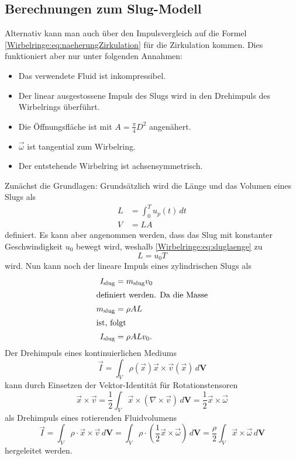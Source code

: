 \subsection{Berechnungen zum Slug-Modell}
Alternativ kann man auch über den Impulsvergleich auf die Formel \eqref{Wirbelringe:eq:naeherungZirkulation} für die Zirkulation kommen.
Dies funktioniert aber nur unter folgenden Annahmen:
\begin{itemize}
    \item Das verwendete Fluid ist inkompressibel.
    \item Der linear ausgestossene Impuls des Slugs wird in den Drehimpuls des Wirbelrings überführt.
    \item Die Öffnungsfläche ist mit \(A = \frac{\pi}{4} D^2\) angenähert.
    \item \(\vec{\omega}\) ist tangential zum Wirbelring.
    \item Der entstehende Wirbelring ist achsensymmetrisch.
\end{itemize} 

Zunächst die Grundlagen:
Grundsätzlich wird die Länge und das Volumen eines Slugs als
\begin{align}
    L
    &=
    \int_{0}^{T}u_p(t)\,dt\\
    \label{Wirbelringe:eq:sluglaenge}
    V
    &=
    LA
\end{align}
definiert.
Es kann aber angenommen werden, dass das Slug mit konstanter Geschwindigkeit \(u_0\) bewegt wird, weshalb \eqref{Wirbelringe:eq:sluglaenge} zu
\begin{equation}
    L
    =
    u_0T
\end{equation}
wird.
Nun kann noch der lineare Impuls eines zylindrischen Slugs als
\begin{align}
    I_{\text{slug}}
    &=
    m_{\text{slug}}v_0\\
    \intertext{definiert werden. Da die Masse}
    m_{\text{slug}}
    &=
    \rho AL\\
    \intertext{ist, folgt}
    I_{\text{slug}}
    &=
    \rho ALv_0
    \label{Wirbelringe:eq:slugImp}.
\end{align}
Der Drehimpuls eines kontinuierlichen Mediums
\begin{equation*}
    \vec{I}
    =
    \int_{V}\rho(\vec{x})\vec{x}\times\vec{v}(\vec{x})\,d\mathbf{V}
\end{equation*}
kann durch Einsetzen der Vektor-Identität für Rotationstensoren \cite{Wirbelringe:batchelor1967}
\begin{equation*}
    \vec{x}\times\vec{v}
    =
    \frac{1}{2}\int_{V}\vec{x}\times(\nabla\times\vec{v})\,d\mathbf{V}
    =
    \frac{1}{2}\vec{x}\times\vec{\omega}
\end{equation*}
als Drehimpuls eines rotierenden Fluidvolumens 
\begin{equation}
    \vec{I}
    =
    \int_{V}\rho\cdot\vec{x}\times\vec{v}\,d\mathbf{V}
    =
    \int_{V}\rho\cdot(\frac{1}{2}\vec{x}\times\vec{\omega})\,d\mathbf{V}
    =
    \frac{\rho}{2}\int_{V}\vec{x}\times\vec{\omega}\,d\mathbf{V}
    \label{Wirbelringe:eq:Drehimpuls}
\end{equation}
hergeleitet werden. 

